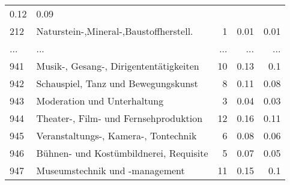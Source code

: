 \begin{longtable}{lXrrr}
          \num[round-mode=places,round-precision=2]{0,12} &
          \num[round-mode=places,round-precision=2]{0,09} \\
        212 & \multicolumn{1}{X}{Naturstein-,Mineral-,Baustoffherstell.} & %
          \num{1} &
          \num[round-mode=places,round-precision=2]{0,01} &
          \num[round-mode=places,round-precision=2]{0,01} \\
       ... & ... & ... & ... & ... \\
        941 & \multicolumn{1}{X}{Musik-, Gesang-, Dirigententätigkeiten} & %
          \num{10} &
          \num[round-mode=places,round-precision=2]{0,13} &
          \num[round-mode=places,round-precision=2]{0,1} \\

        942 & \multicolumn{1}{X}{Schauspiel, Tanz und Bewegungskunst} & %
          \num{8} &
          \num[round-mode=places,round-precision=2]{0,11} &
          \num[round-mode=places,round-precision=2]{0,08} \\

        943 & \multicolumn{1}{X}{Moderation und Unterhaltung} & %
          \num{3} &
          \num[round-mode=places,round-precision=2]{0,04} &
          \num[round-mode=places,round-precision=2]{0,03} \\

        944 & \multicolumn{1}{X}{Theater-, Film- und Fernsehproduktion} & %
          \num{12} &
          \num[round-mode=places,round-precision=2]{0,16} &
          \num[round-mode=places,round-precision=2]{0,11} \\

        945 & \multicolumn{1}{X}{Veranstaltungs-, Kamera-, Tontechnik} & %
          \num{6} &
          \num[round-mode=places,round-precision=2]{0,08} &
          \num[round-mode=places,round-precision=2]{0,06} \\

        946 & \multicolumn{1}{X}{Bühnen- und Kostümbildnerei, Requisite} & %
          \num{5} &
          \num[round-mode=places,round-precision=2]{0,07} &
          \num[round-mode=places,round-precision=2]{0,05} \\

        947 & \multicolumn{1}{X}{Museumstechnik und -management} & %
          \num{11} &
          \num[round-mode=places,round-precision=2]{0,15} &
          \num[round-mode=places,round-precision=2]{0,1} \\


\end{longtable}
